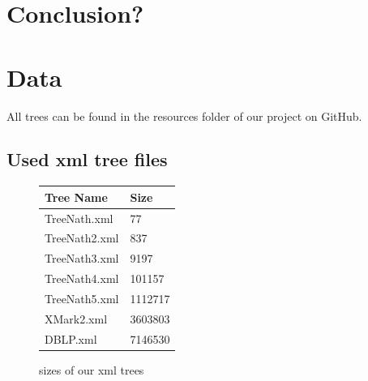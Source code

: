 \documentclass{article}
\begin{document}
\section{Conclusion?}

\section{Data}
All trees can be found in the resources folder of our project on GitHub.
\subsection{Used xml tree files}
\begin{figure}[h]
	\begin{tabular}{ |p{3cm}||p{}| }
		 \hline
		 Tree Name & Size\\
		 \hline
		 TreeNath.xml   &77 \\
		 TreeNath2.xml&  837 \\
		 TreeNath3.xml&9197\\
		 TreeNath4.xml&101157\\
		 TreeNath5.xml&1112717\\
		 XMark2.xml&3603803\\
		 DBLP.xml&7146530\\
		 \hline
	\end{tabular}
\caption{sizes of our xml trees}
\label{data:table1}
\end{figure}



\end{document}
